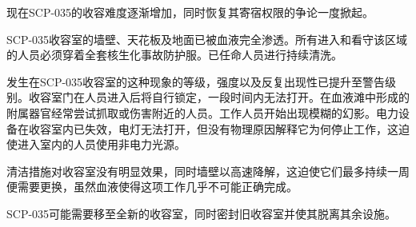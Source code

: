 现在SCP-035的收容难度逐渐增加，同时恢复其寄宿权限的争论一度掀起。

SCP-035收容室的墙壁、天花板及地面已被血液完全渗透。所有进入和看守该区域的人员必须穿着全套核生化事故防护服。已任命人员进行持续清洗。

发生在SCP-035收容室的这种现象的等级，强度以及反复出现性已提升至警告级别。收容室门在人员进入后将自行锁定，一段时间内无法打开。在血液滩中形成的附属器官经常尝试抓取或伤害附近的人员。工作人员开始出现模糊的幻影。电力设备在收容室内已失效，电灯无法打开，但没有物理原因解释它为何停止工作，这迫使进入室内的人员使用非电力光源。

清洁措施对收容室没有明显效果，同时墙壁以高速降解，这迫使它们最多持续一周便需要更换，虽然血液使得这项工作几乎不可能正确完成。

SCP-035可能需要移至全新的收容室，同时密封旧收容室并使其脱离其余设施。
